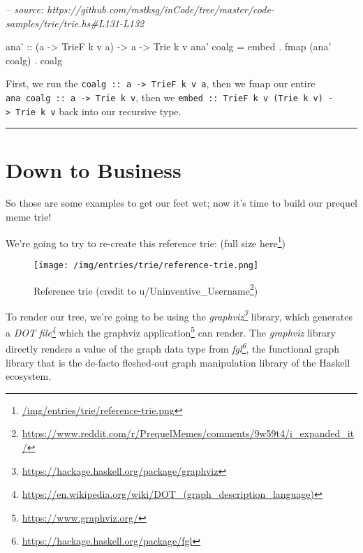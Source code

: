 \documentclass[]{article}
\newenvironment{Shaded}{}{}
\newcommand{\CommentTok}[1]{\textcolor[rgb]{0.38,0.63,0.69}{\textit{#1}}}
\newcommand{\DataTypeTok}[1]{\textcolor[rgb]{0.56,0.13,0.00}{#1}}
\newcommand{\FunctionTok}[1]{\textcolor[rgb]{0.02,0.16,0.49}{#1}}
\newcommand{\NormalTok}[1]{#1}
\newcommand{\OtherTok}[1]{\textcolor[rgb]{0.00,0.44,0.13}{#1}}
\renewcommand{\href}[2]{#2\footnote{\url{#1}}}
\begin{document}
\begin{Shaded}
\begin{Highlighting}[]
\CommentTok{-- source: https://github.com/mstksg/inCode/tree/master/code-samples/trie/trie.hs#L131-L132}

\OtherTok{ana' ::}\NormalTok{ (a }\OtherTok{->} \DataTypeTok{TrieF}\NormalTok{ k v a) }\OtherTok{->}\NormalTok{ a }\OtherTok{->} \DataTypeTok{Trie}\NormalTok{ k v}
\NormalTok{ana' coalg }\FunctionTok{=}\NormalTok{ embed }\FunctionTok{.}\NormalTok{ fmap (ana' coalg) }\FunctionTok{.}\NormalTok{ coalg}
\end{Highlighting}
\end{Shaded}

First, we run the \texttt{coalg\ ::\ a\ -\textgreater{}\ TrieF\ k\ v\ a}, then
we fmap our entire \texttt{ana\ coalg\ ::\ a\ -\textgreater{}\ Trie\ k\ v}, then
we \texttt{embed\ ::\ TrieF\ k\ v\ (Trie\ k\ v)\ -\textgreater{}\ Trie\ k\ v}
back into our recursive type.

\begin{center}\rule{0.5\linewidth}{\linethickness}\end{center}

\hypertarget{down-to-business}{%
\section{Down to Business}\label{down-to-business}}

So those are some examples to get our feet wet; now it's time to build our
prequel meme trie!

We're going to try to re-create this reference trie:
(\href{/img/entries/trie/reference-trie.png}{full size here})

\begin{figure}
\centering
\texttt{[image: /img/entries/trie/reference-trie.png]}
\caption{Reference trie (credit to
\href{https://www.reddit.com/r/PrequelMemes/comments/9w59t4/i_expanded_it/}{u/Uninventive\_Username})}
\end{figure}

To render our tree, we're going to be using the
\emph{\href{https://hackage.haskell.org/package/graphviz}{graphviz}} library,
which generates a
\emph{\href{https://en.wikipedia.org/wiki/DOT_(graph_description_language)}{DOT
file}} which the \href{https://www.graphviz.org/}{graphviz application} can
render. The \emph{graphviz} library directly renders a value of the graph data
type from \emph{\href{https://hackage.haskell.org/package/fgl}{fgl}}, the
functional graph library that is the de-facto fleshed-out graph manipulation
library of the Haskell ecosystem.
\end{document}
